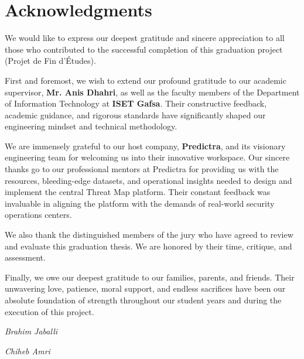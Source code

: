 \chapter*{Acknowledgments}

\thispagestyle{empty}

We would like to express our deepest gratitude and sincere appreciation to all those who contributed to the successful completion of this graduation project (Projet de Fin d'Études).

First and foremost, we wish to extend our profound gratitude to our academic supervisor, \textbf{Mr. Anis Dhahri}, as well as the faculty members of the Department of Information Technology at \textbf{ISET Gafsa}. Their constructive feedback, academic guidance, and rigorous standards have significantly shaped our engineering mindset and technical methodology.

We are immensely grateful to our host company, \textbf{Predictra}, and its visionary engineering team for welcoming us into their innovative workspace. Our sincere thanks go to our professional mentors at Predictra for providing us with the resources, bleeding-edge datasets, and operational insights needed to design and implement the central Threat Map platform. Their constant feedback was invaluable in aligning the platform with the demands of real-world security operations centers.

We also thank the distinguished members of the jury who have agreed to review and evaluate this graduation thesis. We are honored by their time, critique, and assessment.

Finally, we owe our deepest gratitude to our families, parents, and friends. Their unwavering love, patience, moral support, and endless sacrifices have been our absolute foundation of strength throughout our student years and during the execution of this project.

\vspace{1.5cm}

\noindent
\begin{minipage}{0.45\textwidth}
    \begin{flushleft}
        \textit{Brahim Jaballi}
    \end{flushleft}
\end{minipage}%
\hfill
\begin{minipage}{0.45\textwidth}
    \begin{flushright}
        \textit{Chiheb Amri}
    \end{flushright}
\end{minipage}

\newpage
